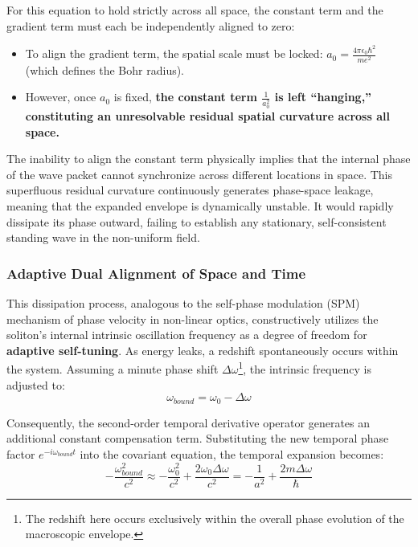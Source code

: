 \documentclass[12pt, a4paper]{article}
\begin{document}
For this equation to hold strictly across all space, the constant term and the gradient term must each be independently aligned to zero:
\begin{itemize}
    \item To align the gradient term, the spatial scale must be locked: $a_0 = \frac{4\pi\epsilon_0 \hbar^2}{m e^2}$ (which defines the Bohr radius).
    \item However, once $a_0$ is fixed, \textbf{the constant term $\frac{1}{a_0^2}$ is left ``hanging,'' constituting an unresolvable residual spatial curvature across all space.}
\end{itemize}

The inability to align the constant term physically implies that the internal phase of the wave packet cannot synchronize across different locations in space. This superfluous residual curvature continuously generates phase-space leakage, meaning that the expanded envelope is dynamically unstable. It would rapidly dissipate its phase outward, failing to establish any stationary, self-consistent standing wave in the non-uniform field.

\subsubsection{Adaptive Dual Alignment of Space and Time}

This dissipation process, analogous to the self-phase modulation (SPM) mechanism of phase velocity in non-linear optics, constructively utilizes the soliton's internal intrinsic oscillation frequency as a degree of freedom for \textbf{adaptive self-tuning}. As energy leaks, a redshift spontaneously occurs within the system. Assuming a minute phase shift $\Delta\omega$\footnote{The redshift here occurs exclusively within the overall phase evolution of the macroscopic envelope.}, the intrinsic frequency is adjusted to:
\begin{equation}
    \omega_{bound} = \omega_0 - \Delta\omega 
\end{equation}

Consequently, the second-order temporal derivative operator generates an additional constant compensation term. Substituting the new temporal phase factor $e^{-i\omega_{bound} t}$ into the covariant equation, the temporal expansion becomes:
\begin{equation}
    -\frac{\omega_{bound}^2}{c^2} \approx -\frac{\omega_0^2}{c^2} + \frac{2\omega_0 \Delta\omega}{c^2} = -\frac{1}{a^2} + \frac{2 m \Delta\omega}{\hbar} 
\end{equation}
\end{document}
